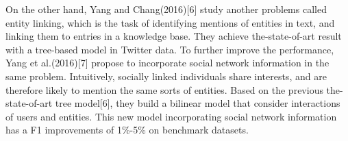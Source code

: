 On the other hand, Yang and Chang(2016)[6] study another problems called entity linking, which is the task of identifying mentions
of entities in text, and linking them to entries in a knowledge base. They achieve the-state-of-art result with a tree-based model in Twitter data.  To further improve the performance, Yang et al.(2016)[7] propose to incorporate social network information in the same problem. Intuitively, socially linked individuals share interests, and are therefore likely to mention the same sorts of entities. Based on the previous the-state-of-art tree model[6], they build a bilinear model  that consider interactions of users and entities. This new model incorporating social network information has a F1 improvements of 1\%-5\% on benchmark datasets.